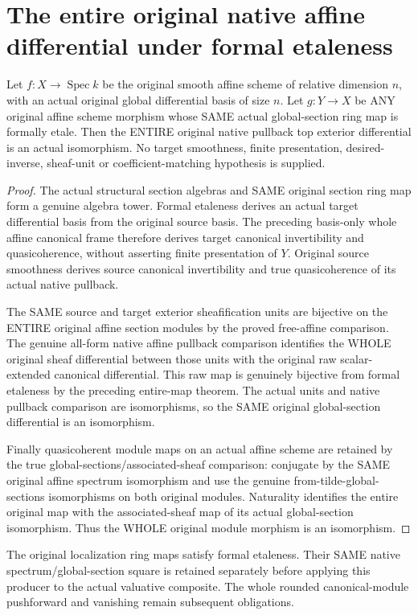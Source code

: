 \section{The entire original native affine differential under formal etaleness}
\label{sec:affine-formally-etale-differential}

\begin{theorem}
\label{sc0-affine-formally-etale:whole-native-differential}
\leanok
Let $f:X\to\operatorname{Spec}k$ be the original smooth affine
scheme of relative dimension $n$, with an actual original global
differential basis of size $n$. Let $g:Y\to X$ be ANY original
affine scheme morphism whose SAME actual global-section ring map
is formally etale. Then the ENTIRE original native pullback top
exterior differential is an actual isomorphism. No target
smoothness, finite presentation, desired-inverse, sheaf-unit or
coefficient-matching hypothesis is supplied.
\end{theorem}
\begin{proof}
The actual structural section algebras and SAME original section
ring map form a genuine algebra tower. Formal etaleness derives
an actual target differential basis from the original source
basis. The preceding basis-only whole affine canonical frame
therefore derives target canonical invertibility and quasicoherence,
without asserting finite presentation of $Y$. Original source
smoothness derives source canonical invertibility and true
quasicoherence of its actual native pullback.

The SAME source and target exterior sheafification units are
bijective on the ENTIRE original affine section modules by the
proved free-affine comparison. The genuine all-form native affine
pullback comparison identifies the WHOLE original sheaf differential
between those units with the original raw scalar-extended
canonical differential. This raw map is genuinely bijective from
formal etaleness by the preceding entire-map theorem. The actual
units and native pullback comparison are isomorphisms, so the SAME
original global-section differential is an isomorphism.

Finally quasicoherent module maps on an actual affine scheme are
retained by the true global-sections/associated-sheaf comparison:
conjugate by the SAME original affine spectrum isomorphism and use
the genuine from-tilde-global-sections isomorphisms on both original
modules. Naturality identifies the entire original map with the
associated-sheaf map of its actual global-section isomorphism.
Thus the WHOLE original module morphism is an isomorphism.
\end{proof}

The original localization ring maps satisfy formal etaleness. Their
SAME native spectrum/global-section square is retained separately
before applying this producer to the actual valuative composite.
The whole rounded canonical-module pushforward and vanishing remain
subsequent obligations.
